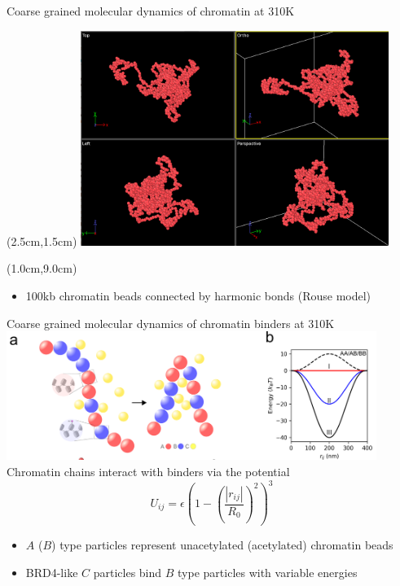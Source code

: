 \documentclass{beamer}					%
\begin{document}
\begin{frame}{Coarse grained molecular dynamics of chromatin at 310K}
\begin{textblock*}{10cm}(2.5cm,1.5cm)
\includegraphics[width=10cm]{../../brd4/brd4/media/Rouse}
\end{textblock*}
\begin{textblock*}{13cm}(1.0cm,9.0cm)
\begin{itemize}
\item 100kb chromatin beads connected by harmonic bonds (Rouse model)
\end{itemize}
\end{textblock*}
\end{frame}

\begin{frame}{Coarse grained molecular dynamics of chromatin binders at 310K}
\includegraphics[width=12cm]{../../brd4/brd4/media/MD-1}
Chromatin chains interact with binders via the potential 
\begin{equation*}
U_{ij} = \epsilon \left(1-\left(\frac{|r_{ij}|}{R_{0}}\right)^{2}\right)^{3}
\end{equation*}
\begin{itemize}
\item $A$ ($B$) type particles represent unacetylated (acetylated) chromatin beads
\item BRD4-like $C$ particles bind $B$ type particles with variable energies
\end{itemize}
\end{frame}
\end{document}
